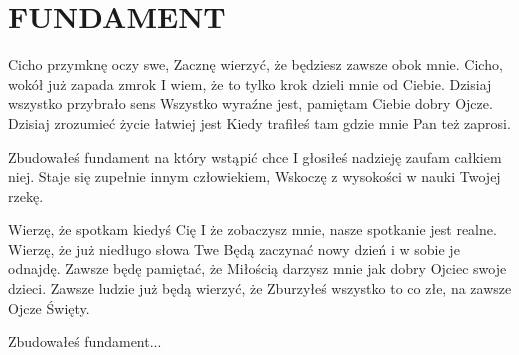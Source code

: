 \documentclass[../../../songbook.tex]{subfiles}
\begin{document}
\TabPositions{8cm} %
\section*{FUNDAMENT}
\vspace{0.5cm}
Cicho przymknę oczy swe,							 \newline
Zacznę wierzyć, że będziesz zawsze obok mnie.		 \newline
Cicho, wokół już zapada zmrok 						\newline
I wiem, że to tylko krok dzieli mnie od Ciebie.						\newline
Dzisiaj wszystko przybrało sens						\newline
Wszystko wyraźne jest, pamiętam Ciebie dobry Ojcze.						\newline
Dzisiaj zrozumieć życie łatwiej jest 						\newline
Kiedy trafiłeś tam gdzie mnie Pan też zaprosi.						\newline

\-\hspace{0.5cm}Zbudowałeś fundament na który wstąpić chce	 \newline
\-\hspace{0.5cm}I głosiłeś nadzieję zaufam całkiem niej.		 \newline
\-\hspace{0.5cm}Staje się zupełnie innym człowiekiem,			 \newline
\-\hspace{0.5cm}Wskoczę z wysokości w nauki Twojej rzekę.		 \newline

Wierzę, że spotkam kiedyś Cię 						\newline
I że zobaczysz mnie, nasze spotkanie jest realne.						\newline
Wierzę, że już niedługo słowa Twe						\newline
Będą zaczynać nowy dzień i w sobie je odnajdę.						\newline
Zawsze będę pamiętać, że 						\newline
Miłością darzysz mnie jak dobry Ojciec swoje dzieci.						\newline
Zawsze ludzie już będą wierzyć, że 						\newline
Zburzyłeś wszystko to co złe, na zawsze Ojcze Święty.						\newline

\-\hspace{1cm}Zbudowałeś fundament...						\newline
\end{document}
